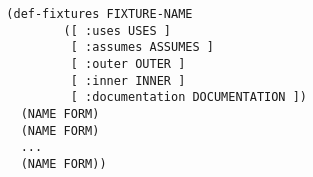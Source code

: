 \begin{verbatim}
  (def-fixtures FIXTURE-NAME
          ([ :uses USES ]
           [ :assumes ASSUMES ]
           [ :outer OUTER ]
           [ :inner INNER ]
           [ :documentation DOCUMENTATION ])
    (NAME FORM)
    (NAME FORM)
    ...
    (NAME FORM))
\end{verbatim}
